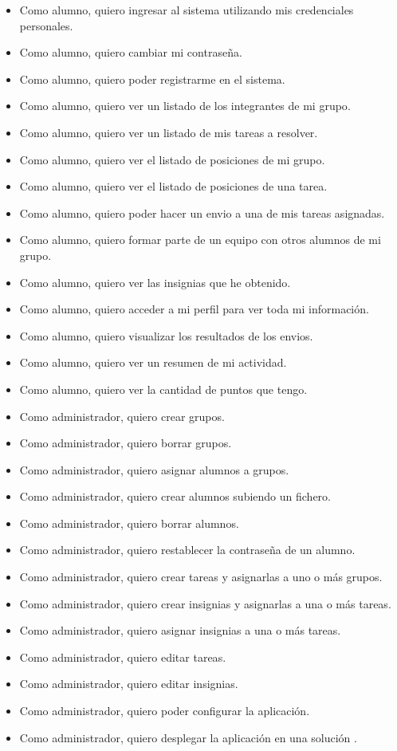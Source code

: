 \documentclass[11pt,spanish,listoffigures,listoftables]{tfgetsinf}
\begin{document}
\begin{itemize}
	\item Como \gls{alumno}, quiero ingresar al sistema utilizando mis credenciales personales.
	\item Como \gls{alumno}, quiero cambiar mi contraseña.
	\item Como \gls{alumno}, quiero poder registrarme en el sistema.
	\item Como \gls{alumno}, quiero ver un listado de los integrantes de mi \gls{grupo}.
	\item Como \gls{alumno}, quiero ver un listado de mis \gls{tarea}s a resolver.
	\item Como \gls{alumno}, quiero ver el listado de posiciones de mi \gls{grupo}.
	\item Como \gls{alumno}, quiero ver el listado de posiciones de una \gls{tarea}. 
	\item Como \gls{alumno}, quiero poder hacer un \gls{envio} a una de mis \gls{tarea}s asignadas.
	\item Como \gls{alumno}, quiero formar parte de un equipo con otros \gls{alumno}s de mi \gls{grupo}.
	\item Como \gls{alumno}, quiero ver las \gls{insignia}s que he obtenido.
	\item Como \gls{alumno}, quiero acceder a mi perfil para ver toda mi información.
	\item Como \gls{alumno}, quiero visualizar los resultados de los \gls{envio}s.
	\item Como \gls{alumno}, quiero ver un resumen de mi actividad.
	\item Como \gls{alumno}, quiero ver la cantidad de puntos que tengo.
	\item Como \gls{administrador}, quiero crear \gls{grupo}s.
	\item Como \gls{administrador}, quiero borrar \gls{grupo}s.
	\item Como \gls{administrador}, quiero asignar \gls{alumno}s a \gls{grupo}s.
	\item Como \gls{administrador}, quiero crear \gls{alumno}s subiendo un fichero.
	\item Como \gls{administrador}, quiero borrar \gls{alumno}s.
	\item Como \gls{administrador}, quiero restablecer la contraseña de un \gls{alumno}.
	\item Como \gls{administrador}, quiero crear \gls{tarea}s y asignarlas a uno o más \gls{grupo}s.
	\item Como \gls{administrador}, quiero crear \gls{insignia}s y asignarlas a una o más \gls{tarea}s.
	\item Como \gls{administrador}, quiero asignar \gls{insignia}s a una o más \gls{tarea}s.
	\item Como \gls{administrador}, quiero editar \gls{tarea}s.
	\item Como \gls{administrador}, quiero editar \gls{insignia}s.
	\item Como \gls{administrador}, quiero poder configurar la aplicación.
	\item Como \gls{administrador}, quiero desplegar la aplicación en una solución .
\end{itemize}
\end{document}
